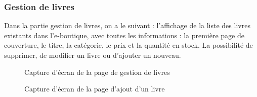 \subsubsection{Gestion de livres}
Dans la partie gestion de livres, on a le suivant : 
l'affichage de la liste des livres existants dans l'e-boutique, avec toutes les informations : la première page de couverture, le titre, la catégorie, le prix et la quantité en stock.
La possibilité de supprimer, de modifier un livre ou d'ajouter un nouveau.
\begin{figure}[H]
    \centering
    \caption{Capture d'écran de la page de gestion de livres}
\end{figure}
\begin{figure}[H]
    \centering
    \caption{Capture d'écran de la page d'ajout d'un livre}
\end{figure}

